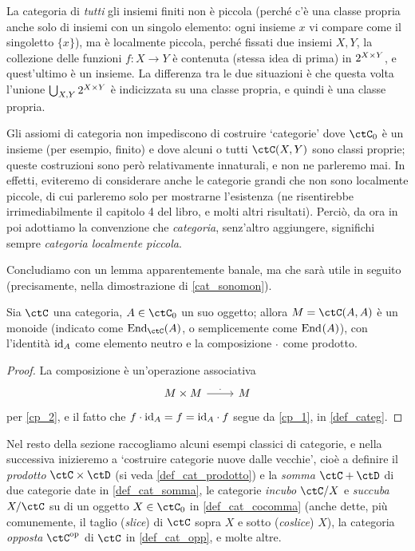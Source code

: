 La categoria di \emph{tutti} gli insiemi finiti non è piccola (perché c'è una classe propria anche solo di insiemi con un singolo elemento: ogni insieme \(x\) vi compare come il singoletto \(\{x\}\)), ma è localmente piccola, perché fissati due insiemi \(X,Y\), la collezione delle funzioni \(f \colon X\to Y\) è contenuta (stessa idea di prima) in \(2^{X\times Y}\), e quest'ultimo è un insieme. La differenza tra le due situazioni è che questa volta l'unione \(\bigcup_{X,Y}2^{X\times Y}\) è indicizzata su una classe propria, e quindi è una classe propria.
\begin{remark}
 Gli assiomi di categoria non impediscono di costruire `categorie' dove \(\ctC_0\) è un insieme (per esempio, finito) e dove alcuni o tutti \(\Hom{\ctC}(X,Y)\) sono classi proprie; queste costruzioni sono però relativamente innaturali, e non ne parleremo mai. In effetti, eviteremo di considerare anche le categorie grandi che non sono localmente piccole, di cui parleremo solo per mostrarne l'esistenza (ne risentirebbe irrimediabilmente il capitolo 4 del libro, e molti altri risultati). Perciò, da ora in poi adottiamo la convenzione che \emph{categoria}, senz'altro aggiungere, significhi sempre \emph{categoria localmente piccola}.
\end{remark}
Concludiamo con un lemma apparentemente banale, ma che sarà utile in seguito (precisamente, nella dimostrazione di \ref{cat_sonomon}).
\begin{lemma}\label{lem_end_monoide}
 Sia \(\ctC\) una categoria, \(A\in\ctC_0\) un suo oggetto; allora \(M=\Hom{\ctC}(A,A)\) è un monoide (indicato come \(\End[\ctC]{A}\), o semplicemente come \(\mathrm{End}_{}(A)\)), con l'identità \(\mathrm{id}_A\) come elemento neutro e la composizione \(\cdot\) come prodotto.
\end{lemma}
\begin{proof}
 La composizione è un'operazione associativa
 \[\begin{tikzcd}
   M\times M \ar[r, "\cmp"] & M
  \end{tikzcd}\]
 per \ref{cp_2}, e il fatto che \(f\cdot \mathrm{id}_A=f=\mathrm{id}_A\cdot f\) segue da \ref{cp_1}, in \ref{def_categ}.
\end{proof}
Nel resto della sezione raccogliamo alcuni esempi classici di categorie, e nella successiva inizieremo a `costruire categorie nuove dalle vecchie', cioè a definire il \emph{prodotto} \(\ctC\times\ctD\) (si veda \ref{def_cat_prodotto}) e la \emph{somma} \(\ctC+\ctD\) di due categorie date in \ref{def_cat_somma}, le categorie \emph{incubo} \(\ctC/X\) e \emph{succuba} \(X/\ctC\) su di un oggetto \(X\in\ctC_0\) in \ref{def_cat_cocomma} (anche dette, più comunemente, il taglio (\emph{slice}) di \(\ctC\) sopra \(X\) e sotto (\emph{coslice}) \(X\)), la categoria \emph{opposta} \(\ctC^\op\) di \(\ctC\) in \ref{def_cat_opp}, e molte altre.

